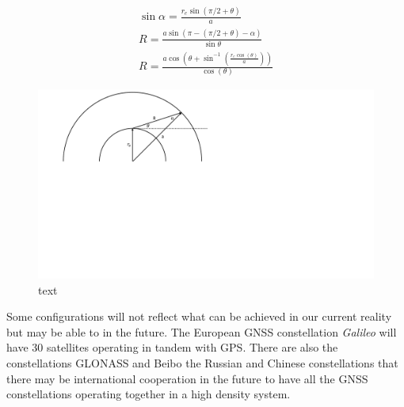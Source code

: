 \begin{eqnarray}
\sin\alpha = \frac{r_e\sin(\pi/2+\theta)}{a}\\
R = \frac{a\sin(\pi-(\pi/2+\theta)-\alpha)}{\sin\theta}\\
R = \frac{a\cos\left( \theta+\sin^{-1}\left( \frac{r_e\cos(\theta)}{a} \right) \right)}{\cos(\theta)}
\end{eqnarray}
\begin{figure}
\centering
\caption{text}
\label{fig:orbit_distance}
\includegraphics[trim={0 11cm 16cm 0},clip,width = 0.7\linewidth]{ChapterExperiments/Figures/orbit_distance}
\end{figure}

Some configurations will not reflect what can be achieved in our current reality but may be able to in the future. The European GNSS constellation \textit{Galileo} will have 30 satellites operating in tandem with GPS. There are also the constellations GLONASS and Beibo the Russian and Chinese constellations that there may be international cooperation in the future to have all the GNSS constellations operating together in a high density system.